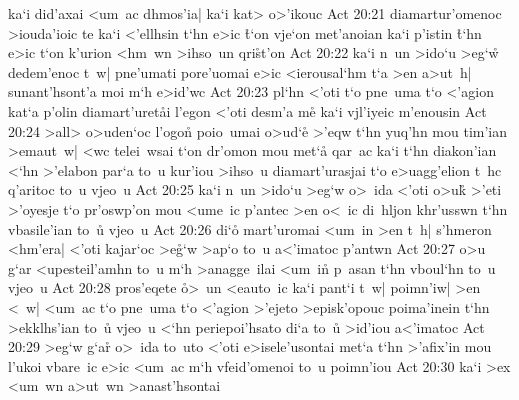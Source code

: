 ka`i
did'axai
<um~ac
dhmos'ia|
ka`i
kat>
o>'ikouc\bibvsend
\vs Act 20:21
diamartur'omenoc
>iouda'ioic
te
ka`i
<'ellhsin
t`hn
e>ic
\r{t}`on
vje`on
met'anoian
ka`i
p'istin
\r{t}`hn
e>ic
t`on
k'urion
<hm~wn
>ihso~un
qri\r{s}t'on\bibvsend
{}
\vs Act 20:22
ka`i
n~un
>ido`u
>eg`w\r{}
dedem'enoc
t~w|
pne'umati
pore'uomai
e>ic
<ierousal`hm
t`a
>en
a>ut~h|
sunant'hsont'a
moi
m`h
e>id'wc\bibvsend
\vs Act 20:23
pl`hn
<'oti
t`o
pne~uma
t`o
<'agion
kat`a
p'olin
diamart'uret\r{a}i
l'egon
<'oti
desm'a
me\r{}
ka`i
vjl'iyeic
m'enousin\bibvsend
\vs Act 20:24
>all>
o>uden`oc
l'ogo\r{n}
poio~umai
o>ud`e\r{}
>'eqw
t`hn
yuq'hn
mou
tim'ian
>emaut~w|
<wc
telei~wsai
t`on
dr'omon
mou
met`a\r{}
qar~ac
ka`i
t`hn
diakon'ian
<`hn
>'elabon
par`a
to~u
kur'iou
>ihso~u
diamart'urasjai
t`o
e>uagg'elion
t~hc
q'aritoc
to~u
vjeo~u\bibvsend
\vs Act 20:25
ka`i
n~un
>ido`u
>eg`w
o>~ida
<'oti
o>uk\r{}
>'eti
>'oyesje
t`o
pr'oswp'on
mou
<ume~ic
p'antec
>en
o<~ic
di~hljon
khr'usswn
t`hn
vbasile'ian
to~u\r{}
vjeo~u\bibvsend
\vs Act 20:26
di`o\r{}
mart'uromai
<um~in
>en
t~h|
s'hmeron
<hm'era|
<'oti
kajar`oc
>e\r{g}`w
>ap`o
to~u
a<'imatoc
p'antwn\bibvsend
\vs Act 20:27
o>u
g`ar
<upesteil'amhn
to~u
m`h
>anagge~ilai
<um~in\r{}
p~asan
t`hn
vboul`hn
to~u
vjeo~u\bibvsend
\vs Act 20:28
pros'eqete
\r{o}>~un
<eauto~ic
ka`i
pant`i
t~w|
poimn'iw|
>en
<~w|
<um~ac
t`o
pne~uma
t`o
<'agion
>'ejeto
>episk'opouc
poima'inein
t`hn
>ekklhs'ian
to~u\r{}
vjeo~u
<`hn
periepoi'hsato
di`a
to~u\r{}
>id'iou
a<'imatoc\bibvsend
\vs Act 20:29
>eg`w
g`ar\r{}
o>~ida
to~uto
<'oti
e>isele'usontai
met`a
t`hn
>'afix'in
mou
l'ukoi
vbare~ic
e>ic
<um~ac
m`h
vfeid'omenoi
to~u
poimn'iou\bibvsend
\vs Act 20:30
ka`i
>ex
<um~wn
a>ut~wn
>anast'hsontai
